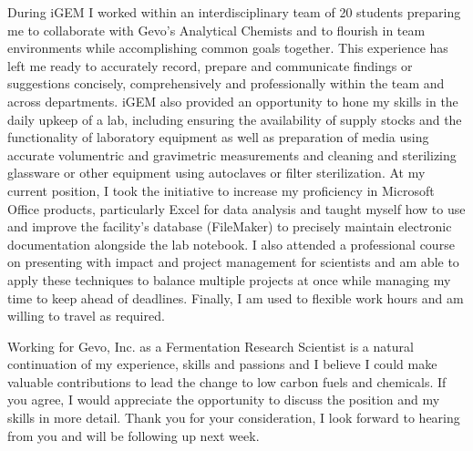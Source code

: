 \documentclass[11pt,a4paper,sans]{moderncv}
\begin{document}
\begin{spacing}{1.15}
During iGEM I worked within an interdisciplinary team of 20 students preparing me to collaborate with Gevo's Analytical Chemists and to flourish in team environments while accomplishing common goals together. This experience has left me ready to accurately record, prepare and communicate findings or suggestions concisely, comprehensively and professionally within the team and across departments. iGEM also provided an opportunity to hone my skills in the daily upkeep of a lab, including ensuring the availability of supply stocks and the functionality of laboratory equipment as well as preparation of media using accurate volumentric and gravimetric measurements and cleaning and sterilizing glassware or other equipment using autoclaves or filter sterilization. At my current position, I took the initiative to increase my proficiency in Microsoft Office products, particularly Excel for data analysis and taught myself how to use and improve the facility's database (FileMaker) to precisely maintain electronic documentation alongside the lab notebook. I also attended a professional course on presenting with impact and project management for scientists and am able to apply these techniques to balance multiple projects at once while managing my time to keep ahead of deadlines. Finally, I am used to flexible work hours and am willing to travel as required.\par\vspace*{2mm}

Working for Gevo, Inc. as a Fermentation Research Scientist is a natural continuation of my experience, skills and passions and I believe I could make valuable contributions to lead the change to low carbon fuels and chemicals. If you agree, I would appreciate the opportunity to discuss the position and my skills in more detail. Thank you for your consideration, I look forward to hearing from you and will be following up next week.

\end{spacing}
\vspace*{2mm} 
\makeletterclosing
\end{document}
